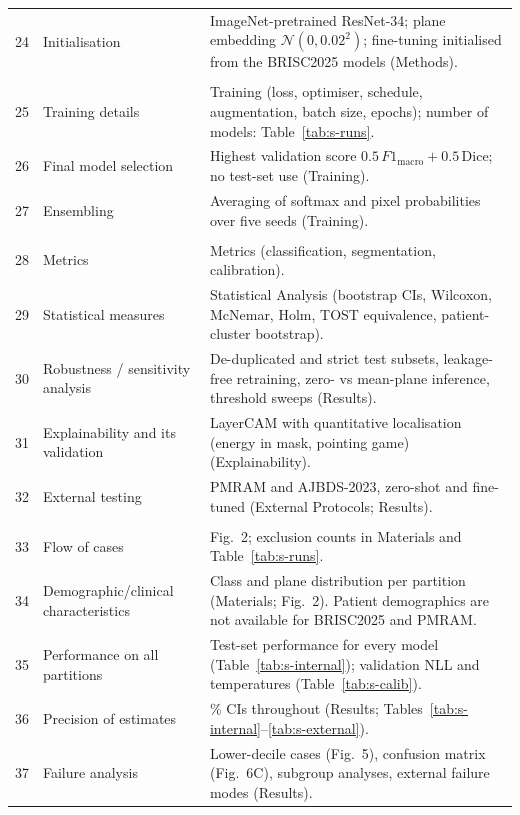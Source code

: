 \documentclass[10pt]{article}
\begin{document}
\begin{longtable}{>{\raggedright}p{0.6cm}>{\raggedright}p{6.6cm}>{\raggedright\arraybackslash}p{8.6cm}}
24 & Initialisation & ImageNet-pretrained ResNet-34; plane embedding $\mathcal{N}(0,0.02^2)$; fine-tuning initialised from the BRISC2025 models (Methods). \\
\multicolumn{3}{l}{\textit{Methods: training}} \\
25 & Training details & Training (loss, optimiser, schedule, augmentation, batch size, epochs); number of models: Table~\ref{tab:s-runs}. \\
26 & Final model selection & Highest validation score $0.5\,F1_{\text{macro}}+0.5\,\text{Dice}$; no test-set use (Training). \\
27 & Ensembling & Averaging of softmax and pixel probabilities over five seeds (Training). \\
\multicolumn{3}{l}{\textit{Methods: evaluation}} \\
28 & Metrics & Metrics (classification, segmentation, calibration). \\
29 & Statistical measures & Statistical Analysis (bootstrap CIs, Wilcoxon, McNemar, Holm, TOST equivalence, patient-cluster bootstrap). \\
30 & Robustness / sensitivity analysis & De-duplicated and strict test subsets, leakage-free retraining, zero- vs mean-plane inference, threshold sweeps (Results). \\
31 & Explainability and its validation & LayerCAM with quantitative localisation (energy in mask, pointing game) (Explainability). \\
32 & External testing & PMRAM and AJBDS-2023, zero-shot and fine-tuned (External Protocols; Results). \\
\multicolumn{3}{l}{\textit{Results}} \\
33 & Flow of cases & Fig.~2; exclusion counts in Materials and Table~\ref{tab:s-runs}. \\
34 & Demographic/clinical characteristics & Class and plane distribution per partition (Materials; Fig.~2). Patient demographics are not available for BRISC2025 and PMRAM. \\
35 & Performance on all partitions & Test-set performance for every model (Table~\ref{tab:s-internal}); validation NLL and temperatures (Table~\ref{tab:s-calib}). \\
36 & Precision of estimates & 95\% CIs throughout (Results; Tables~\ref{tab:s-internal}--\ref{tab:s-external}). \\
37 & Failure analysis & Lower-decile cases (Fig.~5), confusion matrix (Fig.~6C), subgroup analyses, external failure modes (Results). \\

\end{longtable}
\end{document}
